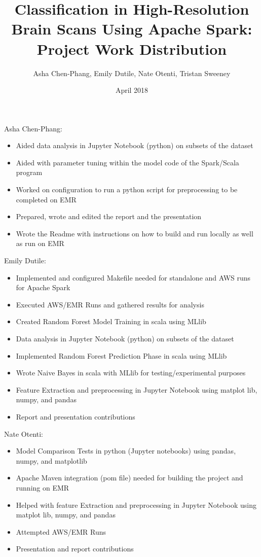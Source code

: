 \documentclass{neu_handout}
\title{Classification in High-Resolution Brain Scans Using Apache Spark: Project Work Distribution}
\author{Asha Chen-Phang, Emily Dutile, Nate Otenti, Tristan Sweeney}
\date{April 2018}
\begin{document}
\newenvironment{myitemize}
{ \begin{itemize}
    \setlength{\itemsep}{0pt}
    \setlength{\parskip}{0pt}
    \setlength{\parsep}{0pt}     }
{ \end{itemize}                  } 

Asha Chen-Phang:
\begin{myitemize}
  \item Aided data analysis in Jupyter Notebook (python) on subsets of the dataset
   \item Aided with parameter tuning within the model code of the Spark/Scala program
   \item Worked on configuration to run a python script for preprocessing to be completed on EMR
  \item Prepared, wrote and edited the report and the presentation
   \item Wrote the Readme with instructions on how to build and run locally as well as run on EMR
\end{myitemize}



Emily Dutile:
\begin{myitemize}
  \item Implemented and configured Makefile needed for standalone and AWS runs for Apache Spark
  \item Executed AWS/EMR Runs and gathered results for analysis
  \item Created Random Forest Model Training in scala using MLlib
  \item Data analysis in Jupyter Notebook (python) on subsets of the dataset
  \item Implemented Random Forest Prediction Phase in scala using MLlib
  \item Wrote Naive Bayes in scala with MLlib for testing/experimental purposes
\item Feature Extraction and preprocessing in Jupyter Notebook using matplot lib, numpy, and pandas
  \item Report and presentation contributions
\end{myitemize}



Nate Otenti:
\begin{myitemize}
  \item Model Comparison Tests in python (Jupyter notebooks) using pandas, numpy, and matplotlib
   \item Apache Maven integration (pom file) needed for building the project and running on EMR
    \item Helped with feature Extraction and preprocessing in Jupyter Notebook using matplot lib, numpy, and pandas
   \item Attempted AWS/EMR Runs
   \item Presentation and report contributions
\end{myitemize}
\end{document}

